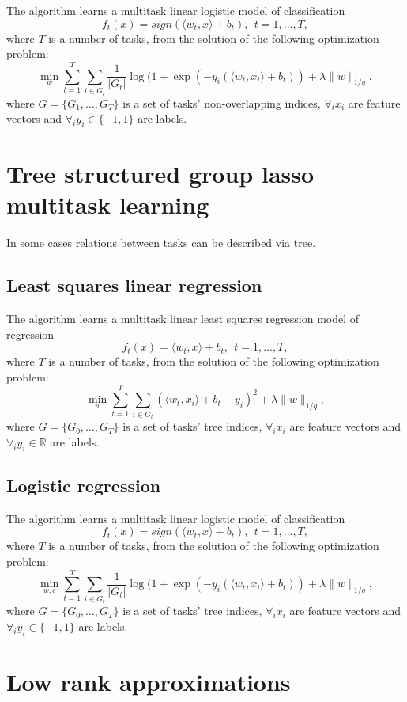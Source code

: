 The algorithm learns a multitask linear logistic model of classification 
$$
f_t(x) = sign (\langle w_t,x \rangle + b_t), ~~ t = 1, \dots, T,
$$
where $T$ is a number of tasks, from the solution of the following optimization problem:
$$
\min_w \sum_{t=1}^{T} \sum_{i \in G_t} \frac{1}{|G_t|} \log (1+\exp\left(-y_i(\langle w_t,x_i \rangle + b_t)\right)
+ \lambda \| w \|_{1/q},
$$
where $G = \{ G_1, \dots, G_T \}$ is a set of tasks' non-overlapping indices, $\forall_i x_i$ are feature 
vectors and $\forall_i y_i \in \{-1,1\}$ are labels.

\section{Tree structured group lasso multitask learning}

In some cases relations between tasks can be described via tree. 

\subsection{Least squares linear regression}

The algorithm learns a multitask linear least squares regression model of regression 
$$
f_t(x) = \langle w_t,x \rangle + b_t, ~~ t = 1, \dots, T,
$$
where $T$ is a number of tasks, from the solution of the following optimization problem:
$$
\min_w \sum_{t=1}^{T} \sum_{i \in G_t} \left(\langle w_t,x_i \rangle + b_t - y_i\right)^2
+ \lambda \| w \|_{1/q},
$$
where $G = \{ G_0, \dots, G_T \}$ is a set of tasks' tree indices, $\forall_i x_i$ are feature 
vectors and $\forall_i y_i \in \mathbb{R}$ are labels.

\subsection{Logistic regression}

The algorithm learns a multitask linear logistic model of classification 
$$
f_t(x) = sign (\langle w_t,x \rangle + b_t), ~~ t = 1, \dots, T,
$$
where $T$ is a number of tasks, from the solution of the following optimization problem:
$$
\min_{w,c} \sum_{t=1}^{T} \sum_{i \in G_t} \frac{1}{|G_t|} \log (1+\exp\left(-y_i(\langle w_t,x_i \rangle + b_t)\right)
+ \lambda \| w \|_{1/q},
$$
where $G = \{ G_0, \dots, G_T \}$ is a set of tasks' tree indices, $\forall_i x_i$ are feature 
vectors and $\forall_i y_i \in \{-1,1\}$ are labels.

\section{Low rank approximations}

